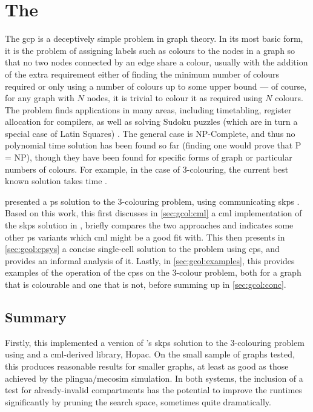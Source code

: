\newcommand{\bo}{\(b\)}

\chapter{\label{chap:gcol}The }

The \gls{gcp} is a deceptively simple problem in graph theory.  In its most basic form, it is the problem of assigning labels such as colours to the nodes in a graph so that no two nodes connected by an edge share a colour, usually with the addition of the extra requirement either of finding the minimum number of colours required or only using a number of colours up to some upper bound --- of course, for any graph with \(N\) nodes, it is trivial to colour it as required using \(N\) colours.  The problem finds applications in many areas, including timetabling, register allocation for compilers, as well as solving Sudoku puzzles (which are in turn a special case of Latin Squares) \cite{Lewis2016}.  The general case is NP-Complete, and thus no polynomial time solution has been found so far (finding one would prove that P = NP), though they have been found for specific forms of graph or particular numbers of colours.  For example, in the case of 3-colouring, the current best known solution takes  time \cite{Beigel2005}.

\citeauthor{Gheorghe2013} presented a \gls{ps} solution to the 3-colouring problem, using communicating \gls{skps} \cite{Gheorghe2013}.  Based on this work, this  first discusses in \cref{sec:gcol:cml} a \gls{cml} implementation of the \gls{skps} solution in \cite{Gheorghe2013}, briefly compares the two approaches and indicates some other \gls{ps} variants which \gls{cml} might be a good fit with.  This  then presents in \cref{sec:gcol:cpsys} a concise single-cell solution to the problem using \gls{cps}, and provides an informal analysis of it.  Lastly, in \cref{sec:gcol:examples}, this  provides examples of the operation of the \glspl{cps} on the 3-colour problem, both for a graph that is colourable and one that is not, before summing up in \cref{sec:gcol:conc}.






\section{\label{sec:gcol:conc}Summary}
Firstly, this  implemented a version of \citeauthor{Gheorghe2013}'s \gls{skps} solution to the 3-colouring problem using \fsharp{} and a \gls{cml}-derived library, Hopac.   On the small sample of graphs tested, this produces reasonable results for smaller graphs, at least as good as those achieved by the \gls{plingua}/\gls{mecosim} simulation.  In both systems, the inclusion of a test for already-invalid \glspl{compartment} has the potential to improve the runtimes significantly by pruning the search space, sometimes quite dramatically.

